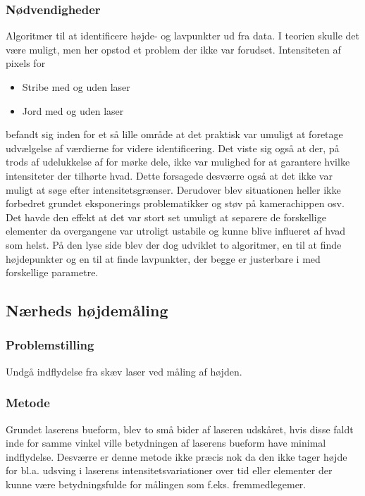 \subsubsection{Nødvendigheder}
Algoritmer til at identificere højde- og lavpunkter ud fra data.
I teorien skulle det være muligt, men her opstod et problem der ikke var forudset. Intensiteten af pixels for
\begin{itemize}
	\item Stribe med og uden laser
	\item Jord med og uden laser
\end{itemize}
befandt sig inden for et så lille område at det praktisk var umuligt at foretage udvælgelse af værdierne for videre identificering. Det viste sig også at der, på trods af udelukkelse af for mørke dele, ikke var mulighed for at garantere hvilke intensiteter der tilhørte hvad. Dette forsagede desværre også at det ikke var muligt at søge efter intensitetsgrænser.
Derudover blev situationen heller ikke forbedret grundet eksponerings problematikker og støv på kamerachippen osv.
Det havde den effekt at det var stort set umuligt at separere de forskellige elementer da overgangene var utroligt ustabile og kunne blive influeret af hvad som helst. På den lyse side blev der dog udviklet to algoritmer, en til at finde højdepunkter og en til at finde lavpunkter, der begge er justerbare i med forskellige parametre.

\subsection{Nærheds højdemåling}
\subsubsection{Problemstilling}
Undgå indflydelse fra skæv laser ved måling af højden.

\subsubsection{Metode}
Grundet laserens bueform, blev to små bider af laseren udskåret, hvis disse faldt inde for samme vinkel ville betydningen af laserens bueform have minimal indflydelse. Desværre er denne metode ikke præcis nok da den ikke tager højde for bl.a. udsving i laserens intensitetsvariationer over tid eller elementer der kunne være betydningsfulde for målingen som f.eks. fremmedlegemer.

